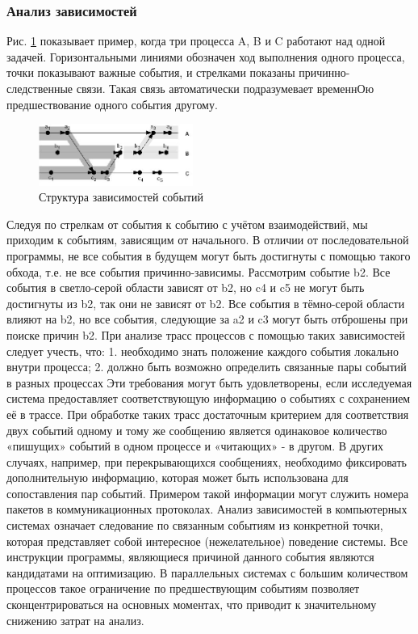 \subsubsection{Анализ зависимостей}
 Рис. \ref{fig:spire08} показывает пример, когда три процесса A, B и C работают над одной задачей. Горизонтальными линиями обозначен ход выполнения одного процесса, точки показывают важные события, и стрелками показаны причинно-следственные связи. Такая связь автоматически подразумевает временнОю предшествование одного события другому. 

\begin{figure}[h!]
	\centering
	\includegraphics[width=0.45\textwidth]{img/img5.jpg}
	
	\caption{Структура зависимостей  событий}
	\label{fig:spire08}
\end{figure}

Следуя по стрелкам от события к событию с учётом взаимодействий, мы приходим к событиям, зависящим от начального. В отличии от последовательной программы, не все события в будущем могут быть достигнуты с помощью такого обхода, т.е. не все события причинно-зависимы. Рассмотрим событие b2. Все события в светло-серой области зависят от b2, но c4 и c5 не могут быть достигнуты из b2, так они не зависят от b2. Все события в тёмно-серой области влияют на b2, но все события, следующие за a2 и c3 могут быть отброшены при поиске причин b2.
При анализе трасс процессов с помощью таких зависимостей следует учесть, что:
1. необходимо знать положение каждого события локально внутри процесса;
2. должно быть возможно определить связанные пары событий в разных процессах
Эти требования могут быть удовлетворены, если исследуемая система предоставляет соответствующую информацию о событиях с сохранением её в трассе. При обработке таких трасс достаточным критерием для соответствия двух событий одному и тому же сообщению является одинаковое количество «пишущих» событий в одном процессе и «читающих» - в другом. В других случаях, например, при перекрывающихся  сообщениях, необходимо фиксировать дополнительную информацию, которая может быть использована для сопоставления пар событий. Примером такой информации могут служить номера пакетов в коммуникационных протоколах.
Анализ зависимостей в компьютерных системах означает следование по связанным событиям из конкретной точки, которая представляет собой интересное (нежелательное) поведение системы. Все инструкции программы, являющиеся причиной данного события являются кандидатами на оптимизацию. В параллельных системах с большим количеством процессов такое ограничение по предшествующим событиям позволяет сконцентрироваться на основных моментах, что приводит к значительному снижению затрат на анализ. 
